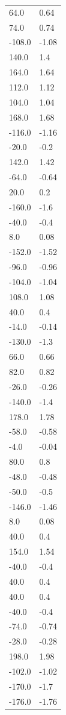 \begin{longtable}{ll}
64.0 & 0.64 \\
74.0 & 0.74 \\
-108.0 & -1.08 \\
140.0 & 1.4 \\
164.0 & 1.64 \\
112.0 & 1.12 \\
104.0 & 1.04 \\
168.0 & 1.68 \\
-116.0 & -1.16 \\
-20.0 & -0.2 \\
142.0 & 1.42 \\
-64.0 & -0.64 \\
20.0 & 0.2 \\
-160.0 & -1.6 \\
-40.0 & -0.4 \\
8.0 & 0.08 \\
-152.0 & -1.52 \\
-96.0 & -0.96 \\
-104.0 & -1.04 \\
108.0 & 1.08 \\
40.0 & 0.4 \\
-14.0 & -0.14 \\
-130.0 & -1.3 \\
66.0 & 0.66 \\
82.0 & 0.82 \\
-26.0 & -0.26 \\
-140.0 & -1.4 \\
178.0 & 1.78 \\
-58.0 & -0.58 \\
-4.0 & -0.04 \\
80.0 & 0.8 \\
-48.0 & -0.48 \\
-50.0 & -0.5 \\
-146.0 & -1.46 \\
8.0 & 0.08 \\
40.0 & 0.4 \\
154.0 & 1.54 \\
-40.0 & -0.4 \\
40.0 & 0.4 \\
40.0 & 0.4 \\
-40.0 & -0.4 \\
-74.0 & -0.74 \\
-28.0 & -0.28 \\
198.0 & 1.98 \\
-102.0 & -1.02 \\
-170.0 & -1.7 \\
-176.0 & -1.76 \\

\end{longtable}
